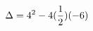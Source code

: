 \documentclass[preview]{standalone}
\begin{document}
\begin{align*}
\special{dvisvgm:raw <g id='unique000'>}\Delta=4^2 - 4(\frac{1}{2})(-6)\special{dvisvgm:raw </g>}
\end{align*}
\end{document}
